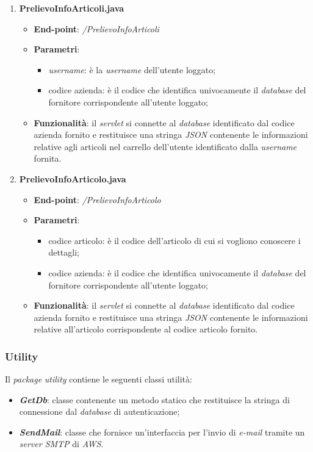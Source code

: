 \documentclass[12pt, a4paper, titlepage]{report}
\begin{document}
\begin{enumerate}
		\item \textbf{PrelievoInfoArticoli.java}
		\begin{itemize}
			\item \textbf{End-point}: \textit{/PrelievoInfoArticoli}
			\item \textbf{Parametri}:
			\begin{itemize}
				\item \textit{username}: è la \textit{username} dell'utente loggato;
				\item codice azienda: è il codice che identifica univocamente il \textit{database} del fornitore corrispondente all'utente loggato;
			\end{itemize}
			\item \textbf{Funzionalità}: il \textit{servlet} si connette al \textit{database} identificato dal codice azienda fornito e restituisce una stringa \textit{JSON} contenente le informazioni relative agli articoli nel carrello dell'utente identificato dalla \textit{username} fornita.
		\end{itemize}
	
		\item \textbf{PrelievoInfoArticolo.java}
		\begin{itemize}
			\item \textbf{End-point}: \textit{/PrelievoInfoArticolo}
			\item \textbf{Parametri}:
			\begin{itemize}
				\item codice articolo: è il codice dell'articolo di cui si vogliono conoscere i dettagli;
				\item codice azienda: è il codice che identifica univocamente il \textit{database} del fornitore corrispondente all'utente loggato;
			\end{itemize}
			\item \textbf{Funzionalità}: il \textit{servlet} si connette al \textit{database} identificato dal codice azienda fornito e restituisce una stringa \textit{JSON} contenente le informazioni relative all'articolo corrispondente al codice articolo fornito.
		\end{itemize}
	\end{enumerate}
	
	\subsubsection{Utility}
	Il \textit{package} \textit{utility} contiene le seguenti classi utilità:
	\begin{itemize}
		\item \textit{\textbf{GetDb}}: classe contenente un metodo statico che restituisce la stringa di connessione dal \textit{database} di autenticazione;
		\item \textit{\textbf{SendMail}}: classe che fornisce un'interfaccia per l'invio di \textit{e-mail} tramite un \textit{server SMTP} di \textit{AWS}.
	\end{itemize}
	
\end{document}
